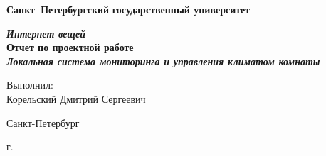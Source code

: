 \begin{titlepage}
\begin{center}

\textbf{Санкт--Петербургский}
\textbf{государственный университет}

\vspace{35mm}

\textbf{\textit{\large Интернет вещей}} \\[8mm]
\textbf{\large Отчет по проектной работе}\\[3mm]
\textbf{\textit{\large Локальная система мониторинга и управления климатом комнаты}}

\vspace{20mm}

\begin{flushright}
\begin{minipage}[t]{0.65\textwidth}

{Выполнил:} \\[2mm]
Корельский Дмитрий Сергеевич
\end{minipage}
\end{flushright}

\vfill

{Санкт-Петербург}
\par{\the\year{} г.}
\end{center}
\end{titlepage}
\restoregeometry
\addtocounter{page}{1}
